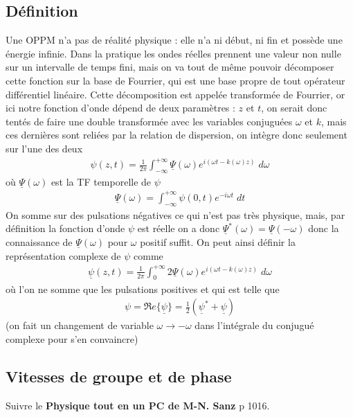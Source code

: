 \documentclass[12pt,prb,aps,epsf]{article}
\begin{document}
\subsection{Définition}
Une OPPM n'a pas de réalité physique : elle n'a ni début, ni fin et possède une énergie infinie. Dans la pratique les ondes réelles prennent une valeur non nulle sur un intervalle de temps fini, mais on va tout de même pouvoir décomposer cette fonction sur la base de Fourrier, qui est une base propre de tout opérateur différentiel linéaire. Cette décomposition est appelée transformée de Fourrier, or ici notre fonction d'onde dépend de deux paramètres : $z$ et $t$, on serait donc tentés de faire une double transformée avec les variables conjuguées $\omega$ et $k$, mais ces dernières sont reliées par la relation de dispersion, on intègre donc seulement sur l'une des deux 
\begin{eqnarray}
\psi (z, t) = \frac{1}{2\pi}\int_{-\infty}^{+\infty} \underline{\Psi} (\omega) e^{i(\omega t - k(\omega)z)}\;d\omega 
\end{eqnarray}
où $\underline{\Psi} (\omega)$ est la TF temporelle de $\psi$
\begin{eqnarray}
\underline{\Psi} (\omega) = \int_{-\infty}^{+\infty} \psi(0,t) e^{-i\omega t} \;dt
\end{eqnarray}
On somme sur des pulsations négatives ce qui n'est pas très physique, mais, par définition la fonction d'onde $\psi$ est réelle on a donc $\underline{\Psi}^{*} (\omega) = \underline{\Psi} (-\omega)$ donc la connaissance de $\underline{\Psi} (\omega)$ pour $\omega$ positif suffit. On peut ainsi définir la représentation complexe de $\psi$ comme 
\begin{eqnarray}
\underline{\psi} (z, t) = \frac{1}{2\pi}\int_{0}^{+\infty} 2 \underline{\Psi} (\omega) e^{i(\omega t - k(\omega)z)}\;d\omega 
\end{eqnarray}
où l'on ne somme que les pulsations positives et qui est telle que 
\begin{eqnarray}
\psi = \Re e \{\underline{\psi} \} = \frac{1}{2}\left(\underline{\psi}^{*} + \underline{\psi}\right)
\end{eqnarray}
(on fait un changement de variable $\omega \rightarrow - \omega$ dans l'intégrale du conjugué complexe pour s'en convaincre)

\subsection{Vitesses de groupe et de phase}
Suivre le \textbf{Physique tout en un PC de M-N. Sanz} p 1016.
\end{document}
